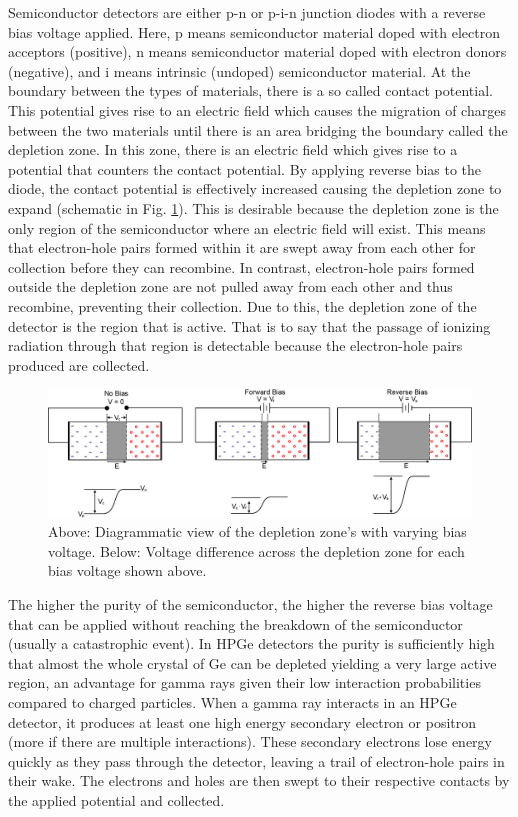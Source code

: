 Semiconductor detectors are either p-n or p-i-n junction diodes with a reverse bias voltage applied. Here, p means semiconductor material doped with electron acceptors (positive), n means semiconductor material doped with electron donors (negative), and i means intrinsic (undoped) semiconductor material. At the boundary between the types of materials, there is a so called contact potential. This potential gives rise to an electric field which causes the migration of charges between the two materials until there is an area bridging the boundary called the depletion zone. In this zone, there is an electric field which gives rise to a potential that counters the contact potential. By applying reverse bias to the diode, the contact potential is effectively increased causing the depletion zone to expand (schematic in Fig. \ref{fig:chp3-pn_diode}). This is desirable because the depletion zone is the only region of the semiconductor where an electric field will exist. This means that electron-hole pairs formed within it are swept away from each other for collection before they can recombine. In contrast, electron-hole pairs formed outside the depletion zone are not pulled away from each other and thus recombine, preventing their collection. Due to this, the depletion zone of the detector is the region that is active. That is to say that the passage of ionizing radiation through that region is detectable because the electron-hole pairs produced are collected.

\begin{figure}[h!]
	\centerline{\includegraphics[width=\textwidth]{./img/c3/pn-diode.eps}}
	\caption{Above: Diagrammatic view of the depletion zone's with varying bias voltage. Below: Voltage difference across the depletion zone for each bias voltage shown above.}
	\label{fig:chp3-pn_diode}
\end{figure}

The higher the purity of the semiconductor, the higher the reverse bias voltage that can be applied without reaching the breakdown of the semiconductor (usually a catastrophic event). In HPGe detectors the purity is sufficiently high that almost the whole crystal of Ge can be depleted yielding a very large active region, an advantage for gamma rays given their low interaction probabilities compared to charged particles. When a gamma ray interacts in an HPGe detector, it produces at least one high energy secondary electron or positron (more if there are multiple interactions). These secondary electrons lose energy quickly as they pass through the detector, leaving a trail of electron-hole pairs in their wake. The electrons and holes are then swept to their respective contacts by the applied potential and collected.

